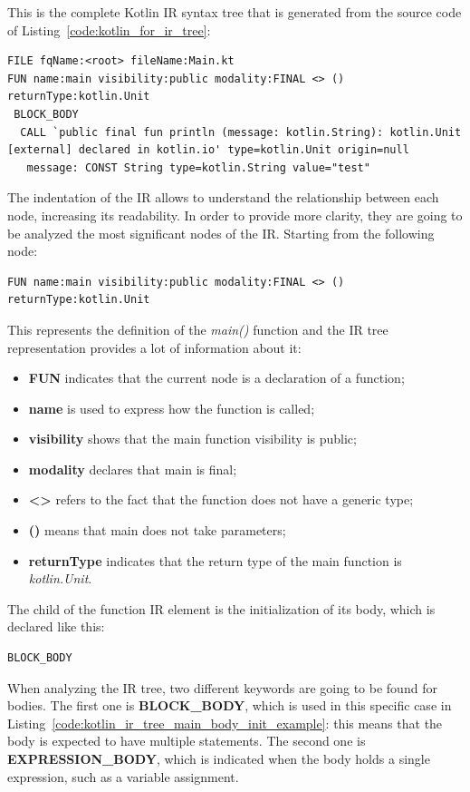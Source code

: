 This is the complete Kotlin IR syntax tree that is generated from the source code of Listing~\ref{code:kotlin_for_ir_tree}:
\begin{lstlisting}[caption={Kotlin IR tree of Listing~\ref{code:kotlin_for_ir_tree}}, captionpos=b, basicstyle=\small, label={code:kotlin_ir_tree_example}]
FILE fqName:<root> fileName:Main.kt
FUN name:main visibility:public modality:FINAL <> () returnType:kotlin.Unit
 BLOCK_BODY
  CALL `public final fun println (message: kotlin.String): kotlin.Unit [external] declared in kotlin.io' type=kotlin.Unit origin=null
   message: CONST String type=kotlin.String value="test"
\end{lstlisting}
The indentation of the IR allows to understand the relationship between each node, increasing its readability. In order to provide more clarity, they are going to be analyzed the most significant nodes of the IR.\newline
Starting from the following node:
\begin{lstlisting}[caption={Kotlin IR tree of the main function in Listing~\ref{code:kotlin_for_ir_tree}}, captionpos=b, label={code:kotlin_ir_tree_main_example}]
FUN name:main visibility:public modality:FINAL <> () returnType:kotlin.Unit
\end{lstlisting}
This represents the definition of the \textit{main()} function and the IR tree representation provides a lot of information about it:
\begin{itemize}
    \item \textbf{FUN} indicates that the current node is a declaration of a function;
    \item \textbf{name} is used to express how the function is called;
    \item \textbf{visibility} shows that the main function visibility is public;
    \item \textbf{modality} declares that main is final;
    \item \textbf{<>} refers to the fact that the function does not have a generic type;
    \item \textbf{()} means that main does not take parameters;
    \item \textbf{returnType} indicates that the return type of the main function is \textit{kotlin.Unit}.
\end{itemize}

The child of the function IR element is the initialization of its body, which is declared like this:
\begin{lstlisting}[caption={Kotlin IR tree of the body block of the main function in Listing~\ref{code:kotlin_for_ir_tree}}, captionpos=b, label={code:kotlin_ir_tree_main_body_init_example}]
BLOCK_BODY
\end{lstlisting}
When analyzing the IR tree, two different keywords are going to be found for bodies. The first one is \textbf{BLOCK\_BODY}, which is used in this specific case in Listing~\ref{code:kotlin_ir_tree_main_body_init_example}: this means that the body is expected to have multiple statements. The second one is \textbf{EXPRESSION\_BODY}, which is indicated when the body holds a single expression, such as a variable assignment.

